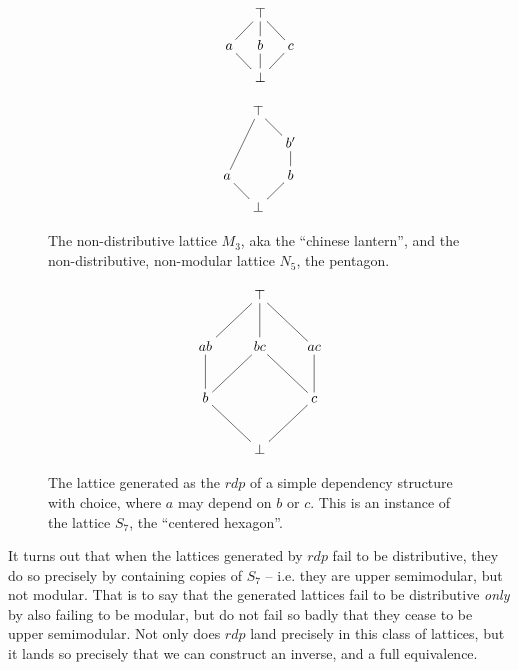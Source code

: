 \documentclass[a4paper,USenglish,cleveref, autoref, thm-restate,authorcolumns]{lipics-v2019}
\begin{document}
\begin{figure}
\centering
\begin{minipage}[c]{0.3\textwidth}
\begin{equation*}
    \xymatrix@=1em{& \top \ar@{-}[dl] \ar@{-}[d] \ar@{-}[dr] & \\
      a \ar@{-}[dr] & b \ar@{-}[d] & c \ar@{-}[dl]  \\
       & \bot &}
\end{equation*}
\end{minipage}
\begin{minipage}[c]{0.3\textwidth}
\begin{equation*}
    \xymatrix@=1em{& \top \ar@{-}[ddl] \ar@{-}[dr] & \\
      & & b'  \ar@{-}[d]  \\
      a \ar@{-}[dr] & & b \ar@{-}[dl] \\
      & \bot &}
\end{equation*}
\end{minipage}

\caption{The non-distributive lattice \(M_3\), aka the ``chinese lantern'', and the non-distributive, non-modular lattice \(N_5\), the pentagon.}
\label{Fig2}
\end{figure}


\begin{figure}
\centering
\begin{minipage}[c]{0.3\textwidth}
\begin{equation*}
    \xymatrix{& \top \ar@{-}[dl] \ar@{-}[d] \ar@{-}[dr] & \\
      ab \ar@{-}[d]& bc \ar@{-}[dl] \ar@{-}[dr] &
        ac \ar@{-}[d]  \\
        b \ar@{-}[dr]  & & c \ar@{-}[dl] \\
        & \bot &
        } 
\end{equation*}
\end{minipage}
\caption{The lattice generated as the \(rdp\) of a simple dependency structure with choice, where \(a\) may depend on \(b\) or \(c\). This is an instance of the lattice \(S_7\), the ``centered hexagon''.}
\label{Fig3}
\end{figure}

It turns out that when the lattices generated by \(rdp\) fail to be distributive, they do so precisely by containing copies of \(S_7\) -- i.e. they are upper semimodular, but not modular. That is to say that the generated lattices fail to be distributive \textit{only} by also failing to be modular, but do not fail so badly that they cease to be upper semimodular. Not only does \(rdp\) land precisely in this class of lattices, but it lands so precisely that we can construct an inverse, and a full equivalence.
\end{document}
